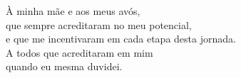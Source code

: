 
\begin{epigrafe}[Dedicatória]

\vspace*{\fill}

\begin{flushright}
À minha mãe e aos meus avós,\\
que sempre acreditaram no meu potencial,\\
e que me incentivaram em cada etapa desta jornada.\\
\vspace{1em}
A todos que acreditaram em mim\\
quando eu mesma duvidei.
\end{flushright}

\end{epigrafe}